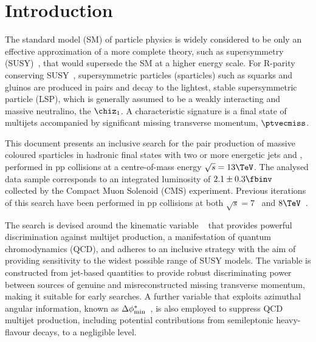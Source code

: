 \section{Introduction}
\label{sec:introduction}

The standard model (SM) of particle physics is widely considered to be
only an effective approximation of a more complete theory, such as
supersymmetry (SUSY)~\cite{ref:SUSY-1,ref:SUSY0,ref:SUSY1,ref:SUSY2,ref:SUSY3,ref:SUSY4,ref:hierarchy1,ref:hierarchy2},
that would supersede the SM at a higher energy scale. For R-parity conserving
SUSY~\cite{Farrar:1978xj}, supersymmetric particles (sparticles) such
as squarks and gluinos are produced in pairs and decay to the
lightest, stable supersymmetric particle (LSP), which is generally
assumed to be a weakly interacting and massive neutralino, the $\chiz_1$. 
A characteristic signature is a final state of multijets accompanied by
significant missing transverse momentum, $\ptvecmiss$.

This document presents an inclusive search for the pair production of
massive coloured sparticles in hadronic final states with two or more
energetic jets and \met, performed in pp collisions at a
centre-of-mass energy $\sqrt{s} = 13\TeV$. The analysed data sample
corresponds to an integrated luminosity of $2.1 \pm 0.3
\fbinv$~\cite{lumi} collected by the Compact Muon Solenoid (CMS)
experiment. Previous iterations of this search have been performed in
pp collisions at both $\sqrt{s} = 7$~\cite{RA1Paper, RA1Paper2011,
  RA1Paper2011FULL} and $8\TeV$~\cite{RA1Paper2012}.


The search is devised around the kinematic variable
\alphat~\cite{Randall:2008rw, RA1Paper} that provides powerful
discrimination against multijet production, a manifestation of quantum
chromodynamics (QCD), and adheres to an inclusive strategy with the
aim of providing sensitivity to the widest possible range of SUSY
models. The \alphat variable is constructed from jet-based quantities
to provide robust discriminating power between sources of genuine and
misreconstructed missing transverse momentum, making it suitable for early
searches. A further variable that exploits azimuthal angular
information, known as $\Delta\phi^{*}_{\rm min}$~\cite{RA1Paper}, is
also employed to suppress QCD multijet production, including potential
contributions from semileptonic heavy-flavour decays, to a negligible
level.

